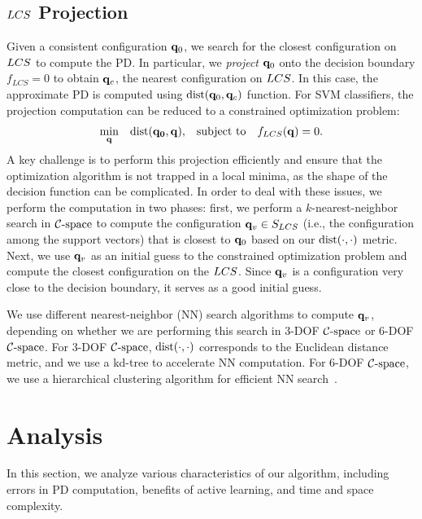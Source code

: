 \subsection{$LCS$ Projection}
Given a consistent configuration $\mathbf q_0$, we search for the closest configuration
on $LCS$ to compute the PD. In particular,
we \emph{project} $\mathbf q_0$ onto the decision boundary $f_{LCS} = 0$ to obtain $\mathbf q_c$, the nearest configuration on $LCS$. In this case, the approximate
PD is computed using $\operatorname{dist}(\mathbf q_0, \mathbf q_c)$ function.
For SVM classifiers, the projection computation can be reduced to a constrained
optimization problem:
\begin{equation}
\begin{aligned}
\label{eq:projection}
 & \underset{\mathbf q}{\text{min}} & \operatorname{dist}(\mathbf {\mathbf q_0}, \mathbf q), & & \text{subject to} & & f_{LCS}(\mathbf q) = 0.
\end{aligned}
\end{equation}
A key challenge is to perform this projection efficiently and ensure that the optimization algorithm is not
trapped in a local minima, as the shape of the decision function can be complicated.
In order to deal with these issues, we perform the computation in two phases:
first, we perform a $k$-nearest-neighbor search in $\mathcal C\text{-space}$ to compute the configuration
$\mathbf q_v \in S_{LCS}$ (i.e., the configuration among the support vectors) that is closest to $\mathbf q_0$ based on our $\operatorname{dist}(\cdot, \cdot)$ metric. Next, we
use $\mathbf q_v$ as an initial guess to the constrained optimization problem and compute the closest configuration on the $LCS$.
Since $\mathbf q_v$ is a configuration very close to the decision boundary, it serves as a good initial guess.

We use different nearest-neighbor (NN)  search algorithms to compute $\mathbf q_v$, depending on whether we are
performing this search in 3-DOF $\mathcal C\text{-space}$ or 6-DOF $\mathcal C\text{-space}$. For 3-DOF $\mathcal C\text{-space}$, $\operatorname{dist}(\cdot, \cdot)$ corresponds to the Euclidean distance metric, and we use a kd-tree to accelerate NN computation. For 6-DOF $\mathcal C\text{-space}$, we use a hierarchical clustering algorithm for efficient NN search~\cite{Muja:2009:FAN}.

\section{Analysis}\label{sec:2:analysis}
In this section, we analyze various characteristics of our algorithm, including errors in PD computation, benefits of active learning, and time and space complexity.

